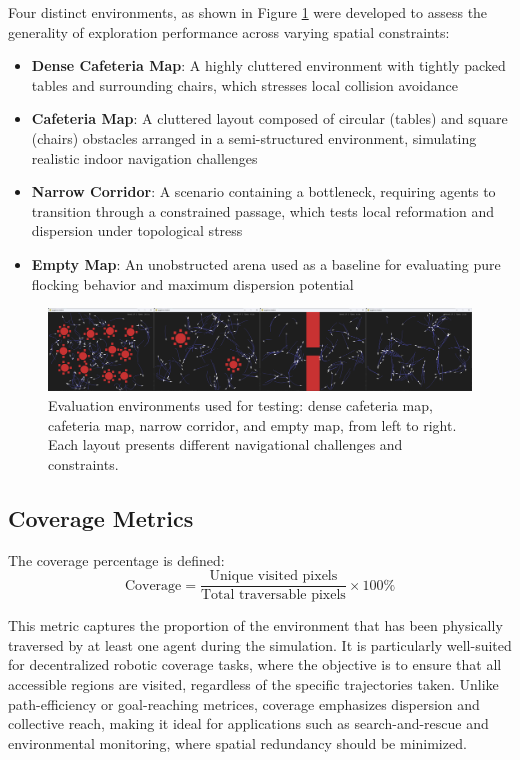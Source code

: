 \documentclass[12pt]{article}
\begin{document}
Four distinct environments, as shown in Figure \ref{fig:boids_maps} were developed to assess the generality of exploration performance across varying spatial constraints:
\begin{itemize}[nosep]
    \item \textbf{Dense Cafeteria Map}: A highly cluttered environment with tightly packed tables and surrounding chairs, which stresses local collision avoidance
    \item \textbf{Cafeteria Map}: A cluttered layout composed of circular (tables) and square (chairs) obstacles arranged in a semi-structured environment, simulating realistic indoor navigation challenges
    \item \textbf{Narrow Corridor}: A scenario containing a bottleneck, requiring agents to transition through a constrained passage, which tests local reformation and dispersion under topological stress
    \item \textbf{Empty Map}: An unobstructed arena used as a baseline for evaluating pure flocking behavior and maximum dispersion potential
\end{itemize}

\begin{figure}[h!]
    \centering
    \includegraphics[width=\linewidth, trim=0 0 0 35, clip]{boids_maps.png}
    \caption{Evaluation environments used for testing: dense cafeteria map, cafeteria map, narrow corridor, and empty map, from left to right. Each layout presents different navigational challenges and constraints.}
    \label{fig:boids_maps}
  \end{figure}

\subsection{Coverage Metrics}

The coverage percentage is defined:
\begin{equation}\text{Coverage} = \frac{\text{Unique visited pixels}}{\text{Total traversable pixels}} \times 100\%\end{equation}

This metric captures the proportion of the environment that has been physically traversed by at least one agent during the simulation. It is particularly well-suited for decentralized robotic coverage tasks, where the objective is to ensure that all accessible regions are visited, regardless of the specific trajectories taken. Unlike path-efficiency or goal-reaching metrices, coverage emphasizes dispersion and collective reach, making it ideal for applications such as search-and-rescue and environmental monitoring, where spatial redundancy should be minimized.
\end{document}
